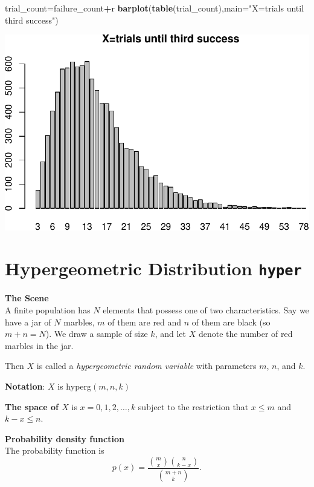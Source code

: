 \documentclass[
]{book}
\newenvironment{Shaded}{\begin{snugshade}}{\end{snugshade}}
\newcommand{\AttributeTok}[1]{\textcolor[rgb]{0.13,0.29,0.53}{#1}}
\newcommand{\FunctionTok}[1]{\textcolor[rgb]{0.13,0.29,0.53}{\textbf{#1}}}
\newcommand{\NormalTok}[1]{#1}
\newcommand{\OtherTok}[1]{\textcolor[rgb]{0.56,0.35,0.01}{#1}}
\newcommand{\SpecialCharTok}[1]{\textcolor[rgb]{0.81,0.36,0.00}{\textbf{#1}}}
\newcommand{\StringTok}[1]{\textcolor[rgb]{0.31,0.60,0.02}{#1}}
\theoremstyle{definition}
\theoremstyle{definition}
\theoremstyle{definition}
\theoremstyle{definition}
\theoremstyle{remark}
\begin{document}
\begin{Shaded}
\begin{Highlighting}[]
\NormalTok{trial\_count}\OtherTok{=}\NormalTok{failure\_count}\SpecialCharTok{+}\NormalTok{r}
\FunctionTok{barplot}\NormalTok{(}\FunctionTok{table}\NormalTok{(trial\_count),}\AttributeTok{main=}\StringTok{"X=trials until third success"}\NormalTok{)}
\end{Highlighting}
\end{Shaded}

\includegraphics{math340-notes_files/figure-latex/unnamed-chunk-155-1.pdf}

\section{\texorpdfstring{Hypergeometric Distribution \texttt{hyper}}{Hypergeometric Distribution hyper}}\label{hypergeometric-distribution-hyper}

\textbf{The Scene}\\
A finite population has \(N\) elements that possess one of two characteristics. Say we have a jar of \(N\) marbles, \(m\) of them are red and \(n\) of them are black (so \(m + n = N\)). We draw a sample of size \(k\), and let \(X\) denote the number of red marbles in the jar.

Then \(X\) is called a \emph{hypergeometric random variable} with parameters \(m\), \(n\), and \(k\).

\textbf{Notation}: \(X\) is hyperg\((m,n,k)\)

\textbf{The space of \(X\)} is \(x = 0,1,2,\ldots,k\) subject to the restriction that \(x \leq m\) and \(k - x \leq n\).

\textbf{Probability density function}\\
The probability function is \[p(x)= \frac{\binom{m}{x}\binom{n}{k-x}}{\binom{m+n}{k}}.\]
\end{document}
